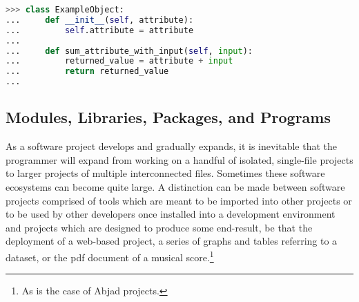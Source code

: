 \begin{lstlisting}[language=Python,frame=tb,caption={Defining a basic class},label=lst:class]
>>> class ExampleObject:
...     def __init__(self, attribute):
...         self.attribute = attribute
...
...     def sum_attribute_with_input(self, input):
...         returned_value = attribute + input
...         return returned_value
...
\end{lstlisting}

\subsection{Modules, Libraries, Packages, and Programs}

As a software project develops and gradually expands, it is inevitable that the programmer will expand from working on a handful of isolated, single-file projects to larger projects of multiple interconnected files. Sometimes these software ecosystems can become quite large. A distinction can be made between software projects comprised of tools which are meant to be imported into other projects or to be used by other developers once installed into a development environment and projects which are designed to produce some end-result, be that the deployment of a web-based project, a series of graphs and tables referring to a dataset, or the pdf document of a musical score.\footnote{As is the case of Abjad projects.}

